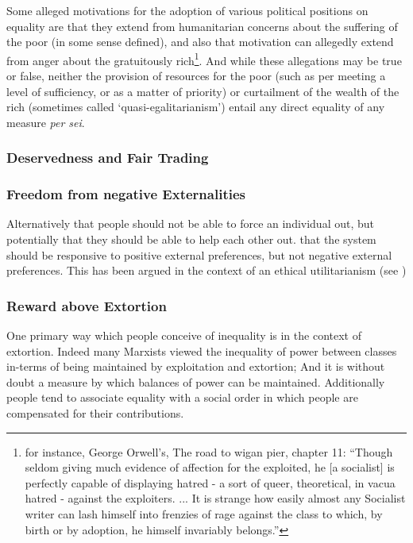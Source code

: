 Some alleged motivations for the adoption of various political positions on equality are that they extend from humanitarian concerns about the suffering of the poor (in some sense defined), and also that motivation can allegedly extend from anger about the gratuitously rich\footnote{for instance, George Orwell's, The road to wigan pier, chapter 11: ``Though seldom giving much evidence of affection for the exploited, he [a socialist] is perfectly capable of displaying hatred - a sort of queer, theoretical, in vacua hatred - against the exploiters. ... It is strange how easily almost any Socialist writer can lash himself into frenzies of rage against the class to which, by birth or by adoption, he himself invariably belongs.'' }.
And while these allegations may be true or false, neither the provision of resources for the poor (such as per meeting a level of sufficiency, or as a matter of priority) or curtailment of the wealth of the rich (sometimes called `quasi-egalitarianism') entail any direct equality of any measure \textit{per sei}.


\subsubsection{Deservedness and Fair Trading}



\subsubsection{Freedom from negative Externalities}

Alternatively that people should not be able to force an individual out, but potentially that they should be able to help each other out.
that the system should be responsive to positive external preferences, but not negative external preferences.
This has been argued in the context of an ethical utilitarianism (see \cite{kymlicka2002contemporary})

\subsubsection{Reward above Extortion}

One primary way which people conceive of inequality is in the context of extortion. Indeed many Marxists viewed the inequality of power between classes in-terms of being maintained by exploitation and extortion; And it is without doubt a measure by which balances of power can be maintained. Additionally people tend to associate equality with a social order in which people are compensated for their contributions.

